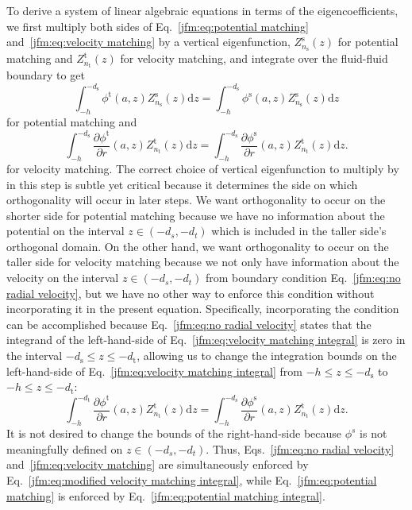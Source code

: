 To derive a system of linear algebraic equations in terms of the eigencoefficients, we first multiply both sides of Eq.~\ref{jfm:eq:potential matching} and~\ref{jfm:eq:velocity matching} by a vertical eigenfunction, $Z^\mathrm{s}_{n_\mathrm{s}}(z)$ for potential matching and $Z^\mathrm{t}_{n_\mathrm{t}}(z)$ for velocity matching, and integrate over the fluid-fluid boundary to get
\begin{equation}\label{jfm:eq:potential matching integral}
    \int_{-h}^{-d_\mathrm{s}}\phi^\mathrm{t}(a,z) Z^\mathrm{s}_{n_\mathrm{s}}(z) \mathrm{d}z=\int_{-h}^{-d_\mathrm{s}}\phi^\mathrm{s}(a,z) Z^\mathrm{s}_{n_\mathrm{s}}(z) \mathrm{d}z
\end{equation}
for potential matching and
\begin{equation}\label{jfm:eq:velocity matching integral}
    \int_{-h}^{-d_\mathrm{s}}\frac{\partial \phi^\mathrm{t}}{\partial r}(a,z) Z^\mathrm{t}_{n_\mathrm{t}}(z) \mathrm{d}z=\int_{-h}^{-d_\mathrm{s}}\frac{\partial \phi^\mathrm{s}}{\partial r}(a,z) Z^\mathrm{t}_{n_\mathrm{t}}(z) \mathrm{d}z.
\end{equation}
for velocity matching.
The correct choice of vertical eigenfunction to multiply by in this step is subtle yet critical because it determines the side on which orthogonality will occur in later steps.
We want orthogonality to occur on the shorter side for potential matching because we have no information about the potential on the interval $z\in(-d_s,-d_t)$ which is included in the taller side's orthogonal domain.
On the other hand, we want orthogonality to occur on the taller side for velocity matching because we not only have information about the velocity on the interval $z\in(-d_s,-d_t)$ from boundary condition Eq.~\ref{jfm:eq:no radial velocity}, but we have no other way to enforce this condition without incorporating it in the present equation.
Specifically, incorporating the condition can be accomplished because Eq.~\ref{jfm:eq:no radial velocity} states that the integrand of the left-hand-side of Eq.~\ref{jfm:eq:velocity matching integral} is zero in the interval $-d_\mathrm{s} \le z \le -d_\mathrm{t}$, allowing us to change the integration bounds on the left-hand-side of Eq.~\ref{jfm:eq:velocity matching integral} from $-h \le z \le -d_\mathrm{s}$ to $-h \le z \le -d_\mathrm{t}$:
\begin{equation}\label{jfm:eq:modified velocity matching integral}
    \int_{-h}^{-d_\mathrm{t}}\frac{\partial \phi^\mathrm{t}}{\partial r}(a,z)Z^\mathrm{t}_{n_\mathrm{t}}(z) \mathrm{d}z=\int_{-h}^{-d_\mathrm{s}}\frac{\partial \phi^\mathrm{s}}{\partial r}(a,z) Z^\mathrm{t}_{n_\mathrm{t}}(z) \mathrm{d}z.
\end{equation}
It is not desired to change the bounds of the right-hand-side because $\phi^s$ is not meaningfully defined on $z\in(-d_s,-d_t)$.
Thus, Eqs.~\ref{jfm:eq:no radial velocity} and~\ref{jfm:eq:velocity matching} are simultaneously enforced by Eq.~\ref{jfm:eq:modified velocity matching integral}, while Eq.~\ref{jfm:eq:potential matching} is enforced by Eq.~\ref{jfm:eq:potential matching integral}. 

